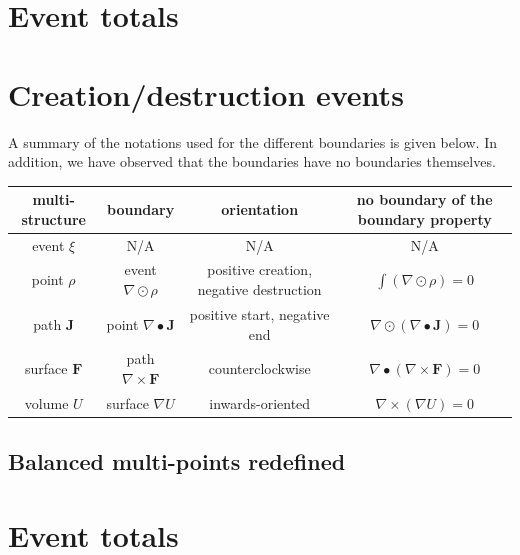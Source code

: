 \vspace{5mm}




\section*{Event totals}




\section*{Creation/destruction events} 



A summary of the notations used for the different boundaries is given below. In addition, we have observed that the boundaries have no boundaries themselves.

\begin{center}
\begin{tabular}{|c||c|c|c|}
\hline
multi-structure & boundary & orientation & no boundary of the boundary property \\
\hline
\hline
event \(\xi\) & 
N/A & 
N/A & 
N/A \\ 
\hline 
point \(\rho\) &
event \(\nabla \odot \rho\) &
\parbox{0.25\textwidth}{
positive creation, negative destruction
} & 
\(\int (\nabla \odot \rho) = 0\) \\ 
\hline 
path \(\mathbf{J}\) & 
point \(\nabla \bullet \mathbf{J}\) & 
positive start, negative end &
\(\nabla \odot (\nabla \bullet \mathbf{J}) = 0\) \\
\hline
surface \(\mathbf{F}\) & 
path \(\nabla \times \mathbf{F}\) & 
counterclockwise &
\(\nabla \bullet (\nabla \times \mathbf{F}) = 0\) \\
\hline
volume \(U\) & 
surface \(\nabla U\) & 
inwards-oriented & 
\(\nabla \times (\nabla U) = 0\) \\
\hline
\end{tabular}
\end{center}




\subsection*{Balanced multi-points redefined}


\section*{Event totals}






